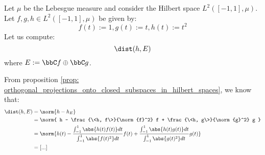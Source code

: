         \begin{example}
            Let $\mu$ be the Lebesgue measure and consider the Hilbert space $L^2([-1, 1], \mu)$. Let $f, g, h \in L^2([-1, 1], \mu)$ be given by:
                $$f(t) := 1, g(t) := t, h(t) := t^2$$
            Let us compute:
                $$\dist( h, E )$$
            where $E := \bbC f \oplus \bbC g$.

            From proposition \ref{prop: orthogonal_projections_onto_closed_subspaces_in_hilbert_spaces}, we know that:
                $$
                    \begin{aligned}
                        \dist(h, E) & = \norm{h - h_E}
                        \\
                        & = \norm{ h - \frac{\<h, f\>}{\norm{f}^2} f + \frac{\<h, g\>}{\norm{g}^2} g }
                        \\
                        & = \norm{ h(t) - \frac{\int_{-1}^1 \abs{h(t) f(t)} dt}{\int_{-1}^1 \abs{f(t)^2} dt} f(t) + \frac{\int_{-1}^1 \abs{h(t) g(t)} dt}{\int_{-1}^1 \abs{g(t)^2} dt} g(t) }
                        \\
                        & = [...]
                    \end{aligned}
                $$
        \end{example}

